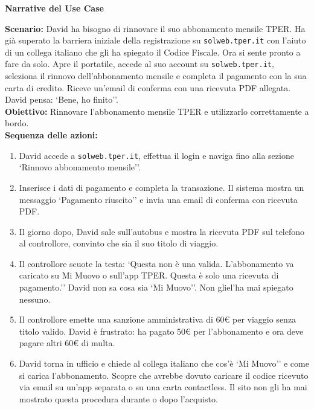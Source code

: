 \documentclass[11pt,a4paper]{article}
\begin{document}
\begin{tcolorbox}[colback=backgroundColor,colframe=borderColor,arc=2mm]
    \textbf{Narrative del Use Case} \\[4pt]
    {\small
    \textbf{Scenario:} David ha bisogno di rinnovare il suo abbonamento mensile TPER. Ha già superato la barriera iniziale della registrazione su \texttt{solweb.tper.it} con l'aiuto di un collega italiano che gli ha spiegato il Codice Fiscale. Ora si sente pronto a fare da solo. Apre il portatile, accede al suo account su \texttt{solweb.tper.it}, seleziona il rinnovo dell'abbonamento mensile e completa il pagamento con la sua carta di credito. Riceve un'email di conferma con una ricevuta PDF allegata. David pensa: `Bene, ho finito''. \\[4pt]

    \textbf{Obiettivo:} Rinnovare l'abbonamento mensile TPER e utilizzarlo correttamente a bordo. \\[4pt]

    \textbf{Sequenza delle azioni:}
    \begin{enumerate}
        \item David accede a \texttt{solweb.tper.it}, effettua il login e naviga fino alla sezione `Rinnovo abbonamento mensile''.
        \item Inserisce i dati di pagamento e completa la transazione. Il sistema mostra un messaggio `Pagamento riuscito'' e invia una email di conferma con ricevuta PDF.
        \item Il giorno dopo, David sale sull'autobus e mostra la ricevuta PDF sul telefono al controllore, convinto che sia il suo titolo di viaggio.
        \item Il controllore scuote la testa: `Questa non è una valida. L'abbonamento va caricato su Mi Muovo o sull'app TPER. Questa è solo una ricevuta di pagamento.'' David non sa cosa sia `Mi Muovo''. Non gliel'ha mai spiegato nessuno.
        \item Il controllore emette una sanzione amministrativa di 60\euro{} per viaggio senza titolo valido. David è frustrato: ha pagato 50\euro{} per l'abbonamento e ora deve pagare altri 60\euro{} di multa.
        \item David torna in ufficio e chiede al collega italiano che cos'è `Mi Muovo'' e come si carica l'abbonamento. Scopre che avrebbe dovuto caricare il codice ricevuto via email su un'app separata o su una carta contactless. Il sito non gli ha mai mostrato questa procedura durante o dopo l'acquisto.
    \end{enumerate}

}
\end{tcolorbox}
\end{document}
